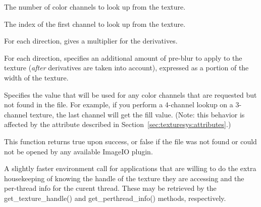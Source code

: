 \vspace{-12pt}
\vspace{10pt}
The number of color channels to look up from the texture.
\apiend

\vspace{-24pt}
\vspace{10pt}
The index of the first channel to look up from the texture.
\apiend

\vspace{-24pt}
\vspace{10pt}
For each direction, gives a multiplier for the derivatives.
\apiend

\vspace{-24pt}
\vspace{10pt}
For each direction, specifies an additional amount of pre-blur to apply
to the texture (\emph{after} derivatives are taken into account),
expressed as a portion of the width of the texture.
\apiend

\vspace{-24pt}
\vspace{10pt}
Specifies the value that will be used for any color channels that are
requested but not found in the file.  For example, if you perform a
4-channel lookup on a 3-channel texture, the last channel will
get the fill value.  (Note: this behavior is affected by the
 attribute described in 
Section~\ref{sec:texturesys:attributes}.)
\apiend

This function returns {\cf true} upon success, or {\cf false} if the
file was not found or could not be opened by any available ImageIO
plugin.
\apiend

A slightly faster {\cf environment} call for applications that are willing
to do the extra housekeeping of knowing the handle of the texture they
are accessing and the per-thread info for the curent thread.  These
may be retrieved by the {\cf get_texture_handle()} and 
{\cf get_perthread_info()} methods, respectively.
\apiend

